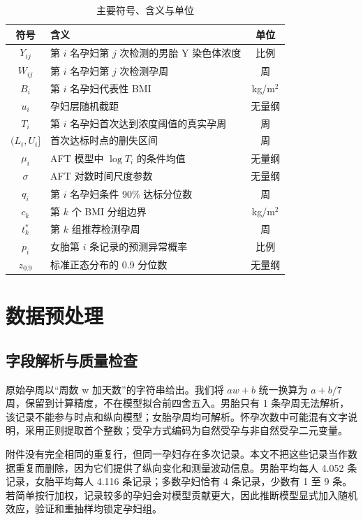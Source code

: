 \documentclass[UTF8,a4paper,12pt]{ctexart}
\begin{document}
\begin{table}[H]
\centering
\caption{主要符号、含义与单位}
\small
\begin{tabularx}{0.96\textwidth}{cXc}
\toprule
符号 & 含义 & 单位 \\
\midrule
$Y_{ij}$ & 第 $i$ 名孕妇第 $j$ 次检测的男胎 Y 染色体浓度 & 比例 \\
$W_{ij}$ & 第 $i$ 名孕妇第 $j$ 次检测孕周 & 周 \\
$B_i$ & 第 $i$ 名孕妇代表性 BMI & kg/m$^2$ \\
$u_i$ & 孕妇层随机截距 & 无量纲 \\
$T_i$ & 第 $i$ 名孕妇首次达到浓度阈值的真实孕周 & 周 \\
$(L_i,U_i]$ & 首次达标时点的删失区间 & 周 \\
$\mu_i$ & AFT 模型中 $\log T_i$ 的条件均值 & 无量纲 \\
$\sigma$ & AFT 对数时间尺度参数 & 无量纲 \\
$q_i$ & 第 $i$ 名孕妇条件 90\% 达标分位数 & 周 \\
$c_k$ & 第 $k$ 个 BMI 分组边界 & kg/m$^2$ \\
$t_k^*$ & 第 $k$ 组推荐检测孕周 & 周 \\
$p_i$ & 女胎第 $i$ 条记录的预测异常概率 & 比例 \\
$z_{0.9}$ & 标准正态分布的 0.9 分位数 & 无量纲 \\
\bottomrule
\end{tabularx}
\end{table}

\section{数据预处理}

\subsection{字段解析与质量检查}

原始孕周以“周数 w 加天数”的字符串给出。我们将 $aw+b$ 统一换算为 $a+b/7$ 周，保留到计算精度，不在模型拟合前四舍五入。男胎只有 1 条孕周无法解析，该记录不能参与时点和纵向模型；女胎孕周均可解析。怀孕次数中可能混有文字说明，采用正则提取首个整数；受孕方式编码为自然受孕与非自然受孕二元变量。

附件没有完全相同的重复行，但同一孕妇存在多次记录。本文不把这些记录当作数据重复而删除，因为它们提供了纵向变化和测量波动信息。男胎平均每人 4.052 条记录，女胎平均每人 4.116 条记录；多数孕妇恰有 4 条记录，少数有 1 至 9 条。若简单按行加权，记录较多的孕妇会对模型贡献更大，因此推断模型显式加入随机效应，验证和重抽样均锁定孕妇组。
\end{document}
